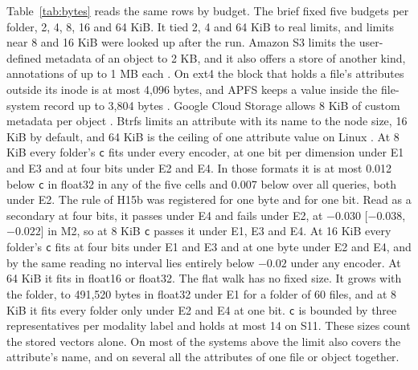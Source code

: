 \documentclass[11pt]{article}
\newcommand{\rep}[1]{\texttt{#1}}
\newcommand{\ci}[2]{[\ensuremath{#1},\,\ensuremath{#2}]}  %
\begin{document}
Table~\ref{tab:bytes} reads the same rows by budget. The brief fixed five budgets per folder, 2, 4, 8, 16 and 64 KiB. It tied 2, 4 and 64 KiB to real limits, and limits near 8 and 16 KiB were looked up after the run. Amazon S3 limits the user-defined metadata of an object to 2 KB, and it also offers a store of another kind, annotations of up to 1 MB each \citep{aws2026s3metadata}. On ext4 the block that holds a file's attributes outside its inode is at most 4,096 bytes, and APFS keeps a value inside the file-system record up to 3,804 bytes \citep{linux2026xattr,e2fsprogs2025ext4,apple2020apfs}. Google Cloud Storage allows 8 KiB of custom metadata per object \citep{google2026gcsquotas}. Btrfs limits an attribute with its name to the node size, 16 KiB by default, and 64 KiB is the ceiling of one attribute value on Linux \citep{linux2026xattr}. At 8 KiB every folder's \rep{c} fits under every encoder, at one bit per dimension under E1 and E3 and at four bits under E2 and E4. In those formats it is at most 0.012 below \rep{c} in float32 in any of the five cells and 0.007 below over all queries, both under E2. The rule of H15b was registered for one byte and for one bit. Read as a secondary at four bits, it passes under E4 and fails under E2, at $-0.030$ \ci{-0.038}{-0.022} in M2, so at 8 KiB \rep{c} passes it under E1, E3 and E4. At 16 KiB every folder's \rep{c} fits at four bits under E1 and E3 and at one byte under E2 and E4, and by the same reading no interval lies entirely below $-0.02$ under any encoder. At 64 KiB it fits in float16 or float32. The flat walk has no fixed size. It grows with the folder, to 491,520 bytes in float32 under E1 for a folder of 60 files, and at 8 KiB it fits every folder only under E2 and E4 at one bit. \rep{c} is bounded by three representatives per modality label and holds at most 14 on S11. These sizes count the stored vectors alone. On most of the systems above the limit also covers the attribute's name, and on several all the attributes of one file or object together.
\end{document}
